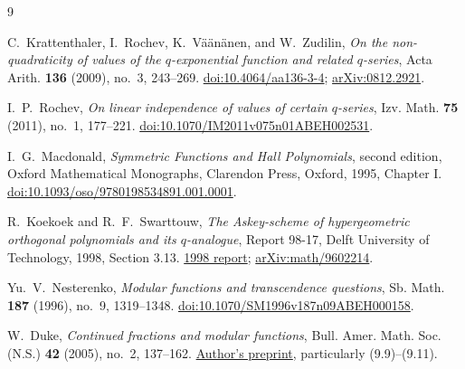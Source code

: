 \documentclass[11pt]{article}
\numberwithin{equation}{section}
\theoremstyle{definition}
\theoremstyle{remark}
\begin{document}
\begin{thebibliography}{9}
\raggedright
{}
C.~Krattenthaler, I.~Rochev, K.~V\"a\"an\"anen, and W.~Zudilin,
\emph{On the non-quadraticity of values of the $q$-exponential function and
related $q$-series}, Acta Arith. \textbf{136} (2009), no.~3, 243--269.
\href{https://doi.org/10.4064/aa136-3-4}{doi:10.4064/aa136-3-4};
\href{https://arxiv.org/abs/0812.2921}{arXiv:0812.2921}.

I.~P.~Rochev, \emph{On linear independence of values of certain $q$-series},
Izv. Math. \textbf{75} (2011), no.~1, 177--221.
\href{https://doi.org/10.1070/IM2011v075n01ABEH002531}
{doi:10.1070/IM2011v075n01ABEH002531}.

I.~G.~Macdonald, \emph{Symmetric Functions and Hall Polynomials},
second edition, Oxford Mathematical Monographs, Clarendon Press, Oxford,
1995, Chapter I.
\href{https://doi.org/10.1093/oso/9780198534891.001.0001}
{doi:10.1093/oso/9780198534891.001.0001}.

R.~Koekoek and R.~F.~Swarttouw, \emph{The Askey-scheme of hypergeometric
orthogonal polynomials and its $q$-analogue}, Report 98-17,
Delft University of Technology, 1998, Section 3.13.
\href{https://tudelft.roelofkoekoek.nl/documents/as98.pdf}{1998 report};
\href{https://arxiv.org/abs/math/9602214}{arXiv:math/9602214}.

Yu.~V.~Nesterenko, \emph{Modular functions and transcendence questions},
Sb. Math. \textbf{187} (1996), no.~9, 1319--1348.
\href{https://doi.org/10.1070/SM1996v187n09ABEH000158}
{doi:10.1070/SM1996v187n09ABEH000158}.

W.~Duke, \emph{Continued fractions and modular functions},
Bull. Amer. Math. Soc. (N.S.) \textbf{42} (2005), no.~2, 137--162.
\href{https://www.math.ucla.edu/~wdduke/preprints/bams4.pdf}{Author's preprint},
particularly (9.9)--(9.11).
\end{thebibliography}
\end{document}

